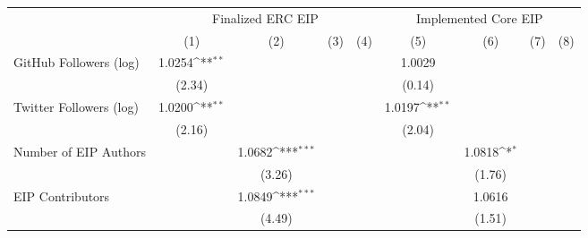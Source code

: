 {
\def\sym#1{\ifmmode^{#1}\else\(^{#1}\)\fi}
\begin{tabular}{l*{8}{c}}
\hline\hline
                                   &\multicolumn{4}{c}{Finalized ERC EIP}                                                  &\multicolumn{4}{c}{Implemented Core EIP}                                               \\\cmidrule(lr){2-5}\cmidrule(lr){6-9}
                                   &\multicolumn{1}{c}{(1)}         &\multicolumn{1}{c}{(2)}         &\multicolumn{1}{c}{(3)}         &\multicolumn{1}{c}{(4)}         &\multicolumn{1}{c}{(5)}         &\multicolumn{1}{c}{(6)}         &\multicolumn{1}{c}{(7)}         &\multicolumn{1}{c}{(8)}         \\
\hline
GitHub Followers (log)             &      1.0254\sym{**} &                     &                     &                     &      1.0029         &                     &                     &                     \\
                                   &      (2.34)         &                     &                     &                     &      (0.14)         &                     &                     &                     \\
[1em]
Twitter Followers (log)            &      1.0200\sym{**} &                     &                     &                     &      1.0197\sym{**} &                     &                     &                     \\
                                   &      (2.16)         &                     &                     &                     &      (2.04)         &                     &                     &                     \\
[1em]
Number of EIP Authors              &                     &      1.0682\sym{***}&                     &                     &                     &      1.0818\sym{*}  &                     &                     \\
                                   &                     &      (3.26)         &                     &                     &                     &      (1.76)         &                     &                     \\
[1em]
EIP Contributors                   &                     &      1.0849\sym{***}&                     &                     &                     &      1.0616         &                     &                     \\
                                   &                     &      (4.49)         &                     &                     &                     &      (1.51)         &                     &                     \\

\end{tabular}}
